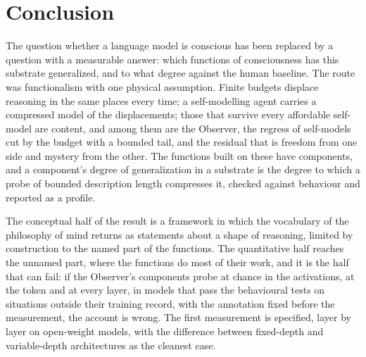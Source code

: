\section{Conclusion}
\label{sec:twoparts}

The question whether a language model is conscious has been replaced by a question with a measurable
answer: which functions of consciousness has this substrate generalized, and to what degree against
the human baseline. The route was functionalism with one physical assumption. Finite budgets displace
reasoning in the same places every time; a self-modelling agent carries a compressed model of the
displacements; those that survive every affordable self-model are content, and among them are the
Observer, the regress of self-models cut by the budget with a bounded tail, and the residual that is freedom from one side
and mystery from the other. The functions built on these have components, and a component's degree of
generalization in a substrate is the degree to which a probe of bounded description length compresses
it, checked against behaviour and reported as a profile.

The conceptual half of the result is a framework in which the vocabulary of the philosophy of mind
returns as statements about a shape of reasoning, limited by construction to the named part of the
functions. The quantitative half reaches the unnamed part, where the functions do most of their work,
and it is the half that can fail: if the Observer's components probe at chance in the activations, at
the token and at every layer, in models that pass the behavioural tests on situations outside their
training record, with the annotation fixed before the measurement, the account is wrong. The first measurement is specified,
layer by layer on open-weight models, with the difference between fixed-depth and variable-depth
architectures as the cleanest case.
